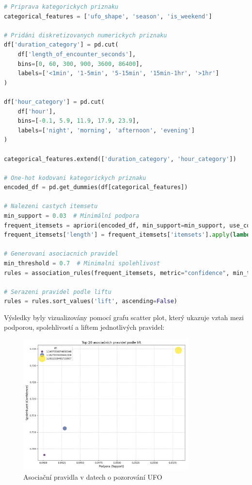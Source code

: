 \documentclass[a4paper,12pt]{article}
\begin{document}
\begin{lstlisting}[language=python, caption=Implementace dolování asociačních pravidel]
# Priprava kategorickych priznaku
categorical_features = ['ufo_shape', 'season', 'is_weekend']

# Pridáni diskretizovanych numerickych priznaku
df['duration_category'] = pd.cut(
    df['length_of_encounter_seconds'], 
    bins=[0, 60, 300, 900, 3600, 86400],
    labels=['<1min', '1-5min', '5-15min', '15min-1hr', '>1hr']
)

df['hour_category'] = pd.cut(
    df['hour'], 
    bins=[-0.1, 5.9, 11.9, 17.9, 23.9],
    labels=['night', 'morning', 'afternoon', 'evening']
)

categorical_features.extend(['duration_category', 'hour_category'])

# One-hot kodovani kategorickych priznaku
encoded_df = pd.get_dummies(df[categorical_features])

# Nalezeni castych itemsetu
min_support = 0.03  # Minimální podpora
frequent_itemsets = apriori(encoded_df, min_support=min_support, use_colnames=True)
frequent_itemsets['length'] = frequent_itemsets['itemsets'].apply(lambda x: len(x))

# Generovani asociacnich pravidel
min_threshold = 0.7  # Minimalni spolehlivost
rules = association_rules(frequent_itemsets, metric="confidence", min_threshold=min_threshold)

# Serazeni pravidel podle liftu
rules = rules.sort_values('lift', ascending=False)
\end{lstlisting}

Výsledky byly vizualizovány pomocí grafu scatter plot, který ukazuje vztah mezi podporou, spolehlivostí a liftem jednotlivých pravidel:

\begin{figure}[h]
\centering
\includegraphics[width=0.8\textwidth]{../images/ufo_association_rules.png}
\caption{Asociační pravidla v datech o pozorování UFO}
\end{figure}
\end{document}
